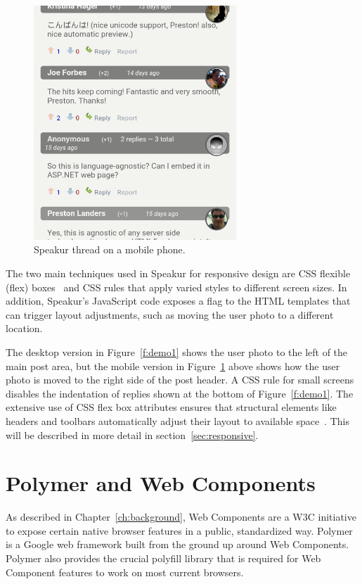 \begin{figure}[htb]
\centering
 \includegraphics[width=3in]{images/mobile2.png}
\caption{Speakur thread on a mobile phone.}
\label{f:mobile1}
\end{figure}

The two main techniques used in Speakur for responsive design are CSS flexible (flex) boxes~\cite{mozillacontributors2015} 
and CSS  rules that apply varied styles to different screen sizes. 
In addition, Speakur's JavaScript code exposes a  flag to the HTML templates that can trigger layout adjustments, 
such as moving the user photo to a different location.

The desktop version in Figure~\ref{f:demo1} shows the user photo to the left of the main post area, 
but the mobile version in Figure~\ref{f:mobile1} above shows how the user photo is moved to the right side of the post header. 
A CSS  rule for small screens disables the indentation of replies shown at the bottom of Figure~\ref{f:demo1}. 
The extensive use of CSS flex box attributes ensures that structural elements like headers and toolbars automatically adjust their layout to available space~\cite{polymercontributors2015-d}. 
This will be described in more detail in section~\ref{sec:responsive}.

\section{Polymer and Web Components}
As described in Chapter~\ref{ch:background}, 
Web Components are a 
W3C initiative 
to expose certain native browser features in a public, standardized way. 
Polymer is a 
Google 
web framework built from the ground up around Web Components.
Polymer also provides the crucial 
polyfill library 
that is required for Web Component features to work on most current browsers.

